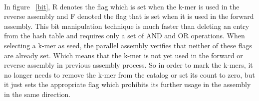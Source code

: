 \label{key}\documentclass[plainarticle, english ,zihtitle,final,hyperref,utf8]{zihpub}
\begin{document}
\paragraph{}
In figure ~\ref{bit}, R denotes the flag which is set when the k-mer is used in the reverse assembly and F denoted the flag that is set when it is used in the forward assembly. This bit manipulation technique is much faster than deleting an entry from the hash table and requires only a set of AND and OR operations. When selecting a k-mer as seed, the parallel assembly verifies that neither of these flags are already set. Which means that the k-mer is not yet used in the forward or reverse assembly in previous assembly process. So in order to mark the k-mers, it no longer needs to remove the k-mer from the catalog or set its count to zero, but it just sets the appropriate flag which prohibits its further usage in the assembly in the same direction.
\end{document}
